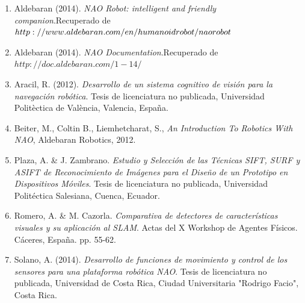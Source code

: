 \documentclass[letterpaper]{article}
\begin{document}
\begin{enumerate}
\item Aldebaran (2014). \textit{NAO Robot: intelligent and friendly companion}.Recuperado de $ http://www.aldebaran.com/en/humanoid\-robot/nao\-robot $
\item Aldebaran (2014). \textit{NAO Documentation}.Recuperado de $ http://doc.aldebaran.com/1-14/ $
\item Aracil, R. (2012). \textit{Desarrollo de un sistema cognitivo de visión para la navegación robótica}. Tesis de licenciatura no publicada, Universidad Polit\`{e}ctica de Val\`{e}ncia, Valencia, España.
\item Beiter, M., Coltin B., Liemhetcharat, S., \textit{An Introduction To Robotics With NAO}, Aldebaran Robotics, 2012.
\item Plaza, A. \& J. Zambrano. \textit{Estudio y Selección de las Técnicas SIFT, SURF y ASIFT de Reconocimiento de Imágenes para el Diseño de un Prototipo en Dispositivos Móviles}. Tesis de licenciatura no publicada, Universidad Politéctica Salesiana, Cuenca, Ecuador.
\item Romero, A. \& M. Cazorla. \textit{Comparativa de detectores de características visuales y su aplicación al SLAM}. Actas del X Workshop de Agentes Físicos. Cáceres, España. pp. 55-62.
\item Solano, A. (2014). \textit{Desarrollo de funciones de movimiento y control de los sensores para una plataforma robótica NAO}. Tesis de licenciatura no publicada, Universidad de Costa Rica, Ciudad Universitaria "Rodrigo Facio", Costa Rica.

\end{enumerate}
	
\end{document}

